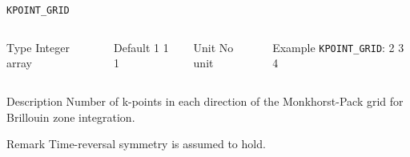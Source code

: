 \begin{frame}[allowframebreaks]{\texttt{KPOINT\_GRID}} \label{KPOINT_GRID}
\vspace*{-12pt}
\begin{columns}
\begin{block}{Type}
Integer array
\end{block}

\begin{block}{Default}
 1 1 1
\end{block}

\begin{block}{Unit}
No unit
\end{block}

\begin{block}{Example}
\texttt{KPOINT\_GRID}: 2 3 4
\end{block}
\end{columns}

\begin{block}{Description}
Number of k-points in each direction of the Monkhorst-Pack grid for Brillouin zone integration.
\end{block}

\begin{block}{Remark}
Time-reversal symmetry is assumed to hold. 
\end{block}

\end{frame}


